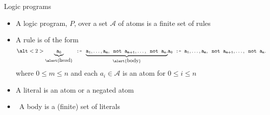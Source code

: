 \begin{frame}{Logic programs}
  \label{eqn:rule}
  \begin{itemize}
  \item <1->
    A \alert{logic program}, $P$, over a set $\mathcal{A}$ of atoms is a finite \alert{set} of rules
    \medskip
  \item <1->
    A \alert{rule} is of the form
    \[
      \alt<2>{\underbrace{\tt a_0}_{\alert{\text{\normalsize head}}} \texttt{ :- } \underbrace{\tt a_1,\dots,a_m,\texttt{ not }{a_{m+1}},\dots,\texttt{ not }{a_n}.}_{\alert{\text{\normalsize body}}}}
             {\tt            a_0                               \texttt{ :- }                  a_1,\dots,a_m,\texttt{ not }{a_{m+1}},\dots,\texttt{ not }{a_n}.}
    \]
    where $0\leq m\leq n$ and each $a_i\in{\mathcal{A}}$ is an \alert{atom} for $0\leq i\leq n$
    \bigskip
  \item <only@4-> A \alert{literal} is an atom or a negated atom
    \smallskip
  \item <only@5->  \ A body is a (finite) \alert{set} of literals
  \end{itemize}
\end{frame}
%
